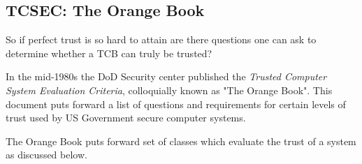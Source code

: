   \subsection{TCSEC: The Orange Book}
  \label{ssec:tcsec_the_orange_book}

    So if perfect trust is so hard to attain are there questions one can ask to determine whether
      a TCB can truly be trusted?
    
    In the mid-1980s the DoD Security center published the \textit{Trusted Computer System Evaluation Criteria}, 
      colloquially known as "The Orange Book".
    This document puts forward a list of questions and requirements for certain levels of trust
      used by US Government secure computer systems. \cite{book1985_tcsec}

    The Orange Book puts forward set of classes which evaluate the trust of a system as discussed below.


